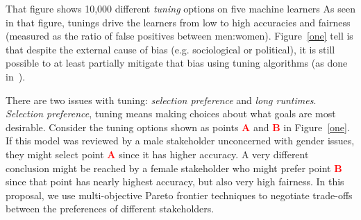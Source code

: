 %
That figure shows 10,000 different {\em tuning} options on five
machine learners
 As seen in that figure, tunings  drive the
learners from   low to   high accuracies and fairness (measured as the ratio of false positives between men:women).
Figure~\ref{one} tell is that despite the
external cause of  bias (e.g.   sociological or political), it is still possible to at least partially
mitigate that bias using tuning  algorithms
(as done in~\cite{F_Cruz_2021,Chakraborty_2020}).

There are two issues with tuning: {\em selection preference} and {\em long runtimes}.
 {\em Selection preference},
tuning means making choices about what goals are most desirable.  Consider 
the tuning options shown as points \textcolor{red}{\bf A} 
and
\textcolor{red}{\bf B} in Figure~\ref{one}. If this model was reviewed by a male stakeholder unconcerned with gender
issues, they might select  point \textcolor{red}{\bf A}  since it has higher accuracy. A very different conclusion
might be reached by a female stakeholder who might prefer point \textcolor{red}{\bf B} since that point has nearly highest accuracy, but also very high fairness.  In this proposal, we use multi-objective Pareto frontier techniques
to negotiate trade-offs between the preferences of different stakeholders.

